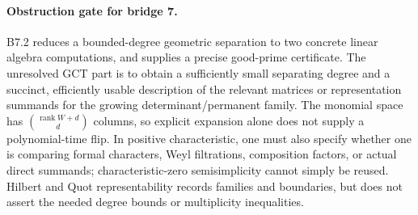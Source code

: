 \paragraph{Obstruction gate for bridge 7.}
B7.2 reduces a bounded-degree geometric separation to two concrete
linear algebra computations, and supplies a precise good-prime
certificate.  The unresolved GCT part is to obtain a sufficiently
small separating degree and a succinct, efficiently usable description
of the relevant matrices or representation summands for the growing
determinant/permanent family.  The monomial space has
$\binom{\operatorname{rank}W+d}{d}$ columns, so explicit expansion
alone does not supply a polynomial-time flip.  In positive
characteristic, one must also specify whether one is comparing formal
characters, Weyl filtrations, composition factors, or actual direct
summands; characteristic-zero semisimplicity cannot simply be reused.
Hilbert and Quot representability records families and boundaries, but
does not assert the needed degree bounds or multiplicity inequalities.
